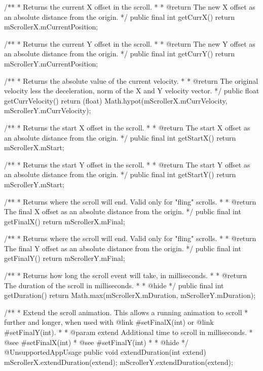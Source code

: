 {    /**
     * Returns the current X offset in the scroll.
     *
     * @return The new X offset as an absolute distance from the origin.
     */
    public final int getCurrX() {
        return mScrollerX.mCurrentPosition;
    }

    /**
     * Returns the current Y offset in the scroll.
     *
     * @return The new Y offset as an absolute distance from the origin.
     */
    public final int getCurrY() {
        return mScrollerY.mCurrentPosition;
    }

    /**
     * Returns the absolute value of the current velocity.
     *
     * @return The original velocity less the deceleration, norm of the X and Y velocity vector.
     */
    public float getCurrVelocity() {
        return (float) Math.hypot(mScrollerX.mCurrVelocity, mScrollerY.mCurrVelocity);
    }

    /**
     * Returns the start X offset in the scroll.
     *
     * @return The start X offset as an absolute distance from the origin.
     */
    public final int getStartX() {
        return mScrollerX.mStart;
    }

    /**
     * Returns the start Y offset in the scroll.
     *
     * @return The start Y offset as an absolute distance from the origin.
     */
    public final int getStartY() {
        return mScrollerY.mStart;
    }

    /**
     * Returns where the scroll will end. Valid only for "fling" scrolls.
     *
     * @return The final X offset as an absolute distance from the origin.
     */
    public final int getFinalX() {
        return mScrollerX.mFinal;
    }

    /**
     * Returns where the scroll will end. Valid only for "fling" scrolls.
     *
     * @return The final Y offset as an absolute distance from the origin.
     */
    public final int getFinalY() {
        return mScrollerY.mFinal;
    }

    /**
     * Returns how long the scroll event will take, in milliseconds.
     *
     * @return The duration of the scroll in milliseconds.
     *
     * @hide
     */
    public final int getDuration() {
        return Math.max(mScrollerX.mDuration, mScrollerY.mDuration);
    }

    /**
     * Extend the scroll animation. This allows a running animation to scroll
     * further and longer, when used with {@link #setFinalX(int)} or {@link #setFinalY(int)}.
     *
     * @param extend Additional time to scroll in milliseconds.
     * @see #setFinalX(int)
     * @see #setFinalY(int)
     *
     * @hide
     */
    @UnsupportedAppUsage
    public void extendDuration(int extend) {
        mScrollerX.extendDuration(extend);
        mScrollerY.extendDuration(extend);
    }

}

